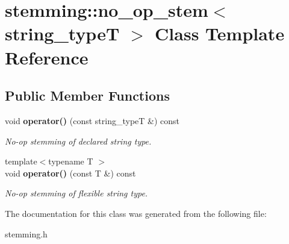 \section{stemming\+:\+:no\+\_\+op\+\_\+stem$<$ string\+\_\+typeT $>$ Class Template Reference}
\label{classstemming_1_1no__op__stem}
\subsection*{Public Member Functions}
\begin{DoxyCompactItemize}
\item 
void {\bf operator()} (const string\+\_\+typeT \&) const \label{classstemming_1_1no__op__stem_a5e95ea3afb739e7bea6b14a3e9150c89}

\begin{DoxyCompactList}\small\item\em No-\/op stemming of declared string type. \end{DoxyCompactList}\item 
{\footnotesize template$<$typename T $>$ }\\void {\bf operator()} (const T \&) const \label{classstemming_1_1no__op__stem_a8109dda5e97b7c138f9aa9ec9ea4ee9f}

\begin{DoxyCompactList}\small\item\em No-\/op stemming of flexible string type. \end{DoxyCompactList}\end{DoxyCompactItemize}


The documentation for this class was generated from the following file\+:\begin{DoxyCompactItemize}
\item 
stemming.\+h\end{DoxyCompactItemize}
